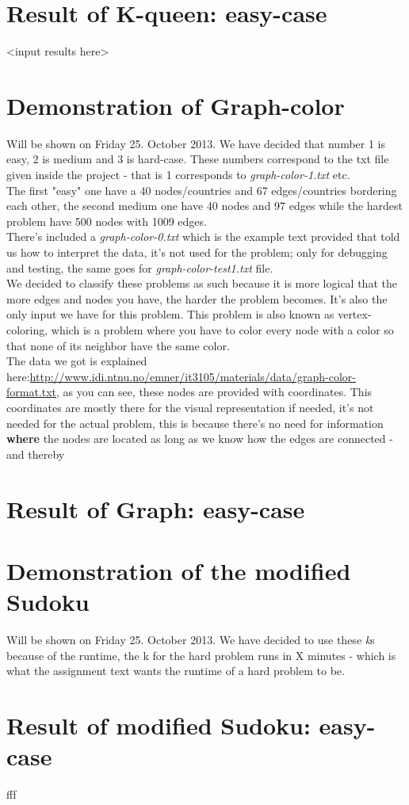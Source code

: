 \documentclass[12pt, a4paper]{article}
\begin{document}
\section{Result of K-queen: easy-case}
<input results here>

\section{Demonstration of Graph-color}
Will be shown on Friday 25. October 2013.
We have decided that number 1 is easy, 2 is medium and 3 is hard-case.  These numbers correspond to the txt file given inside the project - that is 1 corresponds to \textit{graph-color-1.txt} etc.\\
The first "easy" one have a 40 nodes/countries and 67 edges/countries bordering each other, the second medium one have 40 nodes and 97 edges while the hardest problem have 500 nodes with 1009 edges.\\
There's included a \textit{graph-color-0.txt} which is the example text provided that told us how to interpret the data, it's not used for the problem; only for debugging and testing, the same goes for \textit{graph-color-test1.txt} file.\\ 
We decided to classify these problems as such because it is more logical that the more edges and nodes you have, the harder the problem becomes. It's also the only input we have for this problem.
This problem is also known as vertex-coloring, which is a problem where you have to color every node with a color so that none of its neighbor have the same color.\\
The data we got is explained here:\href{http://www.idi.ntnu.no/emner/it3105/materials/data/graph-color-format.txt}{http://www.idi.ntnu.no/emner/it3105/materials/data/graph-color-format.txt},
as you can see, these nodes are provided with coordinates. This coordinates are mostly there for the visual representation if needed, it's not needed for the actual problem, this is because there's no need for information \textbf{where} the nodes are located as long as we know how the edges are connected - and thereby

\section{Result of Graph: easy-case}

\section{Demonstration of the modified Sudoku}
Will be shown on Friday 25. October 2013.
We have decided to use these \textit{k}s because of the runtime, the k for the hard problem runs in X minutes - which is what the assignment text wants the runtime of a hard problem to be.

\section{Result of modified Sudoku: easy-case}
fff
\end{document}
